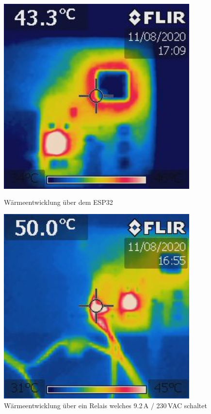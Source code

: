 \begin{figure}[htb]
	\centering
	\begin{minipage}[t]{0.45\linewidth}
		\centering
		\includegraphics[width=0.9\textwidth]{graphics/IR_ESP.jpg}
		\caption{Wärmeentwicklung über dem ESP32}
		\label{pic: IR_ESP}
	\end{minipage}%
	\hfill
	\begin{minipage}[t]{0.45\linewidth}
		\centering
		\includegraphics[width=0.9\textwidth]{graphics/IR_Relais.jpg}
		\caption{Wärmeentwicklung über ein Relais welches 9.2\,A / 230\,VAC schaltet}
		\label{pic: IR_Relais}
	\end{minipage}
\end{figure}

